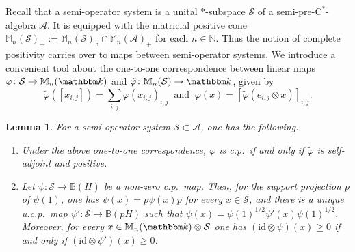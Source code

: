 \documentclass[12pt]{amsart}
\newtheorem{lem}[thm]{Lemma}
\theoremstyle{definition}
\begin{document}
Recall that a semi-operator system is a unital $*$-subspace ${{\mathcal S}}$ of a
{semi-pre-$\mathrm{C}^*$-alge\-bra\xspace} ${{\mathcal A}}$. It is equipped with
the matricial positive cone ${{\mathbb M}}_n({{\mathcal S}})_+:={{\mathbb M}}_n({{\mathcal S}})_{\mathrm{h}}\cap{{\mathbb M}}_n({{\mathcal A}})_+$ for each $n\in{{\mathbb N}}$.
Thus the notion of complete positivity carries over to maps between semi-operator systems.
We introduce a convenient tool about the one-to-one correspondence between linear maps
${\varphi}\colon{{\mathcal S}}\to{{\mathbb M}}_n({{\mathbbm k}})$ and $\tilde{\varphi}\colon{{\mathbb M}}_n({{\mathcal S}})\to{{\mathbbm k}}$, given by
\[
\tilde{\varphi}([x_{i,j}])=\sum_{i,j}{\varphi}(x_{i,j})_{i,j}
\ \mbox{ and }\
{\varphi}(x)=[\tilde{\varphi}(e_{i,j}\otimes x)]_{i,j}.
\]

\begin{lem}\label{lem:corr}
For a semi-operator system ${{\mathcal S}}\subset{{\mathcal A}}$, one has the following.
\begin{enumerate}[$\bullet$]
\item
Under the above one-to-one correspondence,
${\varphi}$ is c.p.\ if and only if $\tilde{\varphi}$ is self-adjoint and positive.
\item
Let $\psi\colon{{\mathcal S}}\to{{\mathbb B}}({H})$ be a non-zero c.p.\ map.
Then, for the support projection $p$ of $\psi(1)$, one has
$\psi(x)=p\psi(x)p$ for every $x\in{{\mathcal S}}$, and
there is a unique u.c.p.\ map $\psi'\colon{{\mathcal S}}\to{{\mathbb B}}(p{H})$
such that $\psi(x)=\psi(1)^{1/2}\psi'(x)\psi(1)^{1/2}$.
Moreover, for every $x\in{{\mathbb M}}_n({{\mathbbm k}})\otimes{{\mathcal S}}$
one has $({\mathrm{id}}\otimes\psi)(x)\geq0$ if and only if $({\mathrm{id}}\otimes\psi')(x)\geq0$.
\end{enumerate}
\end{lem}
\end{document}
